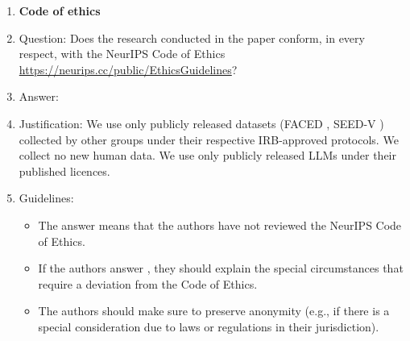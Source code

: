 \begin{enumerate}
\item {\bf Code of ethics}
    \item[] Question: Does the research conducted in the paper conform, in every respect, with the NeurIPS Code of Ethics \url{https://neurips.cc/public/EthicsGuidelines}?
    \item[] Answer: \answerYes{}
    \item[] Justification: We use only publicly released datasets (FACED \citep{chen2023faced}, SEED-V \citep{liu2022seedv}) collected by other groups under their respective IRB-approved protocols. We collect no new human data. We use only publicly released LLMs under their published licences.
    \item[] Guidelines:
    \begin{itemize}
        \item The answer \answerNA{} means that the authors have not reviewed the NeurIPS Code of Ethics.
        \item If the authors answer \answerNo, they should explain the special circumstances that require a deviation from the Code of Ethics.
        \item The authors should make sure to preserve anonymity (e.g., if there is a special consideration due to laws or regulations in their jurisdiction).
    \end{itemize}


\end{enumerate}
